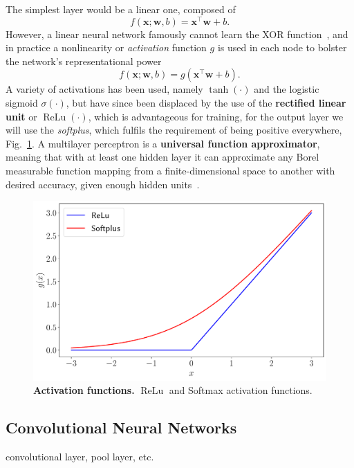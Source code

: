 The simplest layer would be a linear one, composed of
\begin{equation}
f(\mathbf{x}; \mathbf{w}, b) = \mathbf{x}^\intercal \mathbf{w} + b.
\end{equation}
However, a linear neural network famously cannot learn the XOR function~\cite{minsky2017perceptrons}, and in practice a nonlinearity or \emph{activation} function $g$ is used in each node to bolster the network's representational power
\begin{equation}
f(\mathbf{x}; \mathbf{w}, b) = g\left(\mathbf{x}^\intercal \mathbf{w} + b\right).
\end{equation}
A variety of activations has been used, namely $\tanh(\cdot)$ and the logistic sigmoid $\sigma(\cdot)$, but have since been displaced by the use of the \textbf{rectified linear unit} or $\operatorname{ReLu}(\cdot)$, which is advantageous for training, for the output layer we will use the \emph{softplus}, which fulfils the requirement of being positive everywhere, Fig.~\ref{fig:activations}. A multilayer perceptron is a \textbf{universal function approximator}, meaning that with at least one hidden layer it can approximate any Borel measurable function mapping from a finite-dimensional space to another with desired accuracy, given enough hidden units~\cite{leshno1993multilayer}. 
\begin{figure}[H]
	\centering
	\includegraphics[width=\linewidth]{Chapter4/Figs/Vector/activations}
	\caption[Activation functions]{\textbf{Activation functions.} $\operatorname{ReLu}$ and Softmax activation functions.}
	\label{fig:activations}
\end{figure}

\newpage
\subsection{Convolutional Neural Networks} %
\label{subsec:nn-cnn}
convolutional layer, pool layer, etc. 

